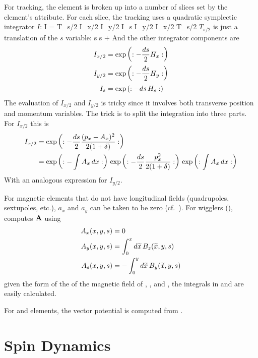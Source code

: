For tracking, the element is broken up into a number of slices set by
the element's  attribute. For each slice, the tracking
uses a quadratic symplectic integrator $I$:
\Begineq
  I = T_{s/2} \; I_{x/2} \; I_{y/2} \; I_s \; I_{y/2} \; I_{x/2} \; T_{s/2}
\Endeq
$T_{s/2}$ is just a translation of the $s$ variable:
\Begineq
  s \rightarrow s + 
\Endeq
And the other integrator components are
\begin{align}
  I_{x/2} &= \exp \left( : -\frac{ds}{2} H_x : \right) \nonumber \\
  I_{y/2} &= \exp \left( : -\frac{ds}{2} H_y : \right) \\
  I_{s}   &= \exp \left( : -ds \, H_s : \right) \nonumber
\end{align}
The evaluation of $I_{x/2}$ and $I_{y/2}$ is tricky since it involves both transverse
position and momentum variables. The trick is to split the integration into three parts.
For $I_{x/2}$ this is
\begin{align}
  I_{x/2} &= \exp \left( : -\frac{ds}{2} \frac{(p_x - A_x)^2}{2 (1 + \delta)} : \right) \nonumber \\
  &= \exp \left( : -\int A_x \, dx : \right) \,
     \exp \left( : -\frac{ds}{2} \frac{p_x^2}{2 (1 + \delta)} : \right) \,
     \exp \left( : \int A_x \, dx : \right)
  \label{ids2}
\end{align}
With an analogous expression for $I_{y/2}$.

For magnetic elements that do not have longitudinal fields
(quadrupoles, sextupoles, etc.), $a_x$ and $a_y$ can be taken to be
zero (cf.~). For wigglers (), \bmad computes ${\bf A}$ using
\begin{align}
  A_x(x,y,s) &= 0 \nonumber \\
  A_y(x,y,s) &=  \int_0^x d\widetilde x \, B_z(\widetilde x, y, s) 
  \label{a0a0a0} \\
  A_s(x,y,s) &= -\int_0^y d\widetilde x \, B_y(\widetilde x, y, s) \nonumber
\end{align}
given the form of the of the magnetic field of , , and
, the integrals in  and  are easily calculated.

For  and  elements, the vector potential is computed from
.

\section{Spin Dynamics}   
\label{s:spin.dyn}   

